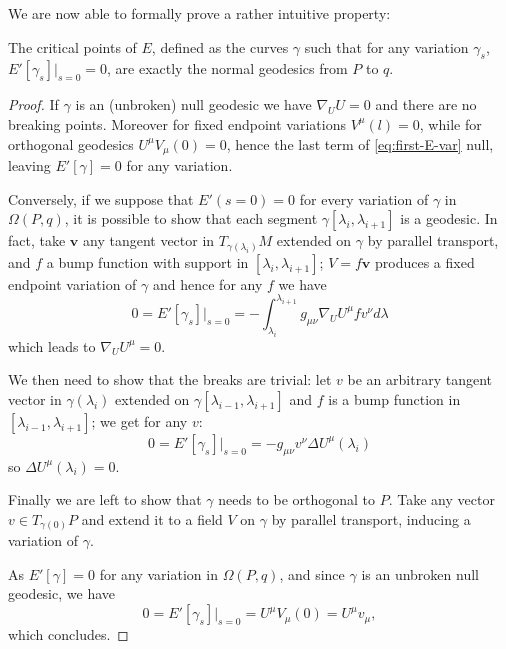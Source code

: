 We are now able to formally prove a rather intuitive property:
\begin{prop}
	\label{prop:perp-critical-gamma}
	The critical points of \(E\), defined as the curves \(\gamma\) such that for any variation \(\gamma_s\), \(E'[\gamma_s]\Big\vert_{s = 0} = 0\), are exactly the normal geodesics from \(P\) to \(q\).
\end{prop}
\begin{proof}
	If \(\gamma\) is an (unbroken) null geodesic we have \(\nabla_UU = 0\) and there are no breaking points. Moreover for fixed endpoint variations \(V^{\mu}(l) = 0\), while for orthogonal geodesics
	\(U^{\mu}V_{\mu}(0) = 0\), hence the last term of \eqref{eq:first-E-var} null, leaving \(E'[\gamma] = 0\) for any variation.
	
	Conversely, if we suppose that \(E'(s =0) = 0\) for every variation of \(\gamma\) in \(\Omega (P,q)\), it is possible to show that each segment \(\gamma[\lambda_i, \lambda_{i + 1}]\) is a geodesic.
	In fact, take \(\textbf{v}\) any tangent vector in \(T_{\gamma(\lambda_i)}M\)  extended on \(\gamma\) by parallel transport, and \(f\) a bump function with support in \([\lambda_i, \lambda_{i + 1}]\); \(V = f\textbf{v}\) produces a fixed endpoint variation of \(\gamma\) and hence for any \(f\) we have 
	\[
	0 = E'[\gamma_s]\vert_{s = 0} = -\int_{\lambda_i}^{\lambda_{i+1}} g_{\mu\nu}\nabla_UU^{\mu} f v^{\nu} d\lambda
	\]
	which leads to \(\nabla_UU^{\mu} = 0\).
	
	We then need to show that the breaks are trivial: let \(v\) be an arbitrary tangent vector in \(\gamma(\lambda_i)\) extended on \(\gamma[\lambda_{i - 1}, \lambda_{i + 1}]\) and \(f\) is a bump function in \([\lambda_{i - 1}, \lambda_{i + 1}]\); we get for any \(v\):
	\[
	0 = E'[\gamma_s]\vert_{s = 0} = -g_{\mu\nu}v^{\nu}\Delta U^{\mu}(\lambda_i)
	\]
	so \(\Delta U^{\mu}(\lambda_i) = 0\).
	
	Finally we are left to show that \(\gamma\) needs to be orthogonal to \(P\). Take any vector \(v \in T_{\gamma(0)}P\) and extend it to a field \(V\) on \(\gamma\) by parallel transport, inducing a variation of \(\gamma\).
	
	\noindent As \(E'[\gamma] = 0\) for any variation in \(\Omega(P, q)\), and since \(\gamma\) is an unbroken null geodesic, we have
	\[
	0 = E'[\gamma_s] \Big\vert_{s = 0} = U^{\mu}V_{\mu} (0) = U^{\mu}v_{\mu},
	\]
	which concludes.
\end{proof}

